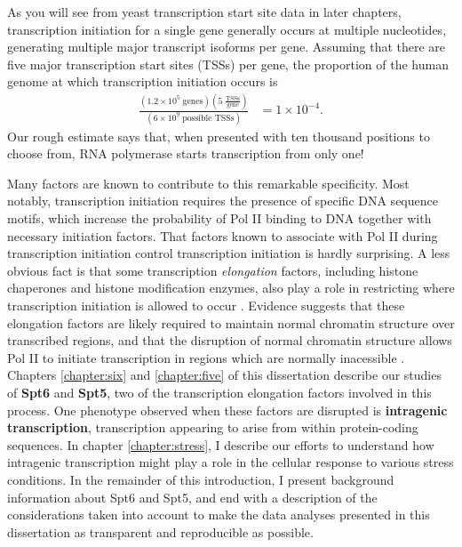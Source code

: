 As you will see from yeast transcription start site data in later chapters, transcription initiation for a single gene generally occurs at multiple nucleotides, generating multiple major transcript isoforms per gene.
Assuming that there are five major transcription start sites (TSSs) per gene, the proportion of the human genome at which transcription initiation occurs is
\begin{align*}
    \frac{\left(1.2 \times 10^5 \; \text{genes}\right) \left(5 \; \frac{\text{TSSs}}{\text{gene}} \right)}
         {\left(6 \times 10^9 \; \text{possible TSSs} \right)}
    &= 1 \times 10^{-4}.
\end{align*}
Our rough estimate says that, when presented with ten thousand positions to choose from, RNA polymerase starts transcription from only one!

Many factors are known to contribute to this remarkable specificity.
Most notably, transcription initiation requires the presence of specific DNA sequence motifs, which increase the probability of Pol II binding to DNA together with necessary initiation factors.
That factors known to associate with Pol II during transcription initiation control transcription initiation is hardly surprising.
A less obvious fact is that some transcription \textit{elongation} factors, including histone chaperones and histone modification enzymes, also play a role in restricting where transcription initiation is allowed to occur \citep{kaplan2003, cheung2008, hennig2013}.
Evidence suggests that these elongation factors are likely required to maintain normal chromatin structure over transcribed regions, and that the disruption of normal chromatin structure allows Pol II to initiate transcription in regions which are normally inacessible \citep{}.
Chapters \ref{chapter:six} and \ref{chapter:five} of this dissertation describe our studies of \textbf{Spt6} and \textbf{Spt5}, two of the transcription elongation factors involved in this process.
One phenotype observed when these factors are disrupted is \textbf{intragenic transcription}, transcription appearing to arise from within protein-coding sequences.
In chapter \ref{chapter:stress}, I describe our efforts to understand how intragenic transcription might play a role in the cellular response to various stress conditions.
In the remainder of this introduction, I present background information about Spt6 and Spt5, and end with a description of the considerations taken into account to make the data analyses presented in this dissertation as transparent and reproducible as possible.

